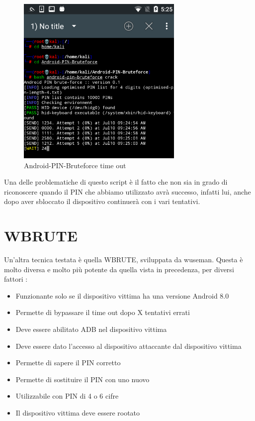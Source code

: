 \begin{figure}[h!]
    \centering
    \includegraphics[width=80mm]{Immagini/3/Screenshot_20210710-052513.png}
    \caption{Android-PIN-Bruteforce time out}
    \label{fig:Android-PIN-Bruteforce}
\end{figure}

Una delle problematiche di questo script è il fatto che non sia in grado di riconoscere quando il PIN che abbiamo utilizzato avrà successo, infatti lui, anche dopo aver sbloccato il dispositivo continuerà con i vari tentativi.

\section{WBRUTE}

Un’altra tecnica testata è quella WBRUTE\cite{wbrute}, sviluppata da wuseman. Questa è molto diversa e molto più potente da quella vista in precedenza, per diversi fattori :

\begin{itemize}
	\item Funzionante solo se il dispositivo vittima ha una versione Android 8.0
	\item Permette di bypassare il time out dopo X tentativi errati
	\item Deve essere abilitato ADB nel dispositivo vittima
	\item Deve essere dato l’accesso al dispositivo attaccante dal dispositivo vittima
	\item Permette di sapere il PIN corretto
	\item Permette di sostituire il PIN con uno nuovo
	\item Utilizzabile con PIN di 4 o 6 cifre
	\item Il dispositivo vittima deve essere rootato
\end{itemize}

